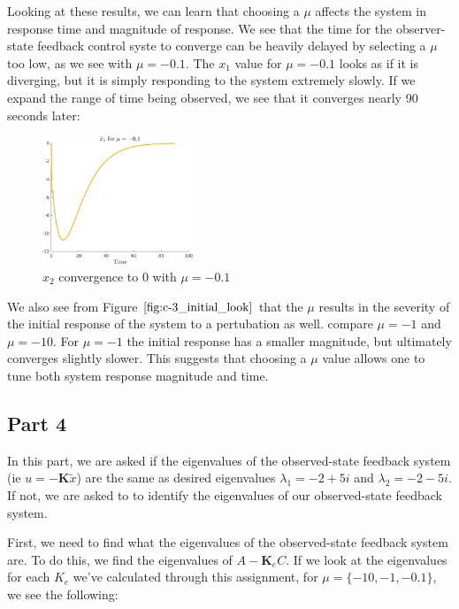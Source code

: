 \documentclass{article}
\begin{document}
Looking at these results, we can learn that choosing a $\mu$ affects the system in response time and magnitude of response. We see that the time for the observer-state feedback control syste to converge can be heavily delayed by selecting a $\mu$ too low, as we see with $\mu=-0.1$. The $x_1$ value for $\mu=-0.1$ looks as if it is diverging, but it is simply responding to the system extremely slowly. If we expand the range of time being observed, we see that it converges nearly 90 seconds later:

\begin{figure}[H]
    \centering
    \includegraphics[width = 0.4\textwidth]{figures/c3-3-01-time-plot.png}
    \caption{$x_2$ convergence to $0$ with $\mu=-0.1$}
    \label{fig:mu_01_time}
\end{figure}

We also see from Figure $\refeq{fig:c-3_initial_look}$ that the $\mu$ results in the severity of the initial response of the system to a pertubation as well. compare $\mu=-1$ and $\mu=-10$. For $\mu=-1$ the initial response has a smaller magnitude, but ultimately converges slightly slower. This suggests that choosing a $\mu$ value allows one to tune both system response magnitude and time.

\subsection*{Part 4}

In this part, we are asked if the eigenvalues of the observed-state feedback system (ie $u = -\boldsymbol{K}\tilde{x}$) are the same as desired eigenvalues $\lambda_1 = -2+5i$ and $\lambda_2 = -2-5i$. If not, we are asked to to identify the eigenvalues of our observed-state feedback system.

First, we need to find what the eigenvalues of the observed-state feedback system are. To do this, we find the eigenvalues of $A-\boldsymbol{K}_e C$.  If we look at the eigenvalues for each $K_e$ we've calculated through this assignment, for $\mu=\{-10, -1, -0.1\}$, we see the following:
\end{document}
